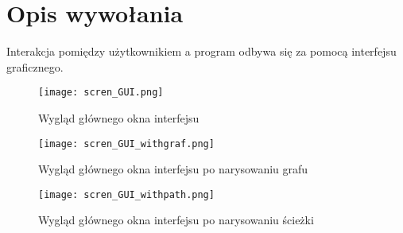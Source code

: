 \documentclass[]{article}
\begin{document}
\section{Opis wywołania}\label{header-n233}

Interakcja pomiędzy użytkownikiem a program odbywa się za pomocą interfejsu graficznego.

\begin{figure}[H]
\begin{center}
  \texttt{[image: scren\_GUI.png]}
  \end{center}
  \caption{Wygląd głównego okna interfejsu}
  \label{fig:graf}
\end{figure}

\begin{figure}[H]
\begin{center}
  \texttt{[image: scren\_GUI\_withgraf.png]}
  \end{center}
  \caption{Wygląd głównego okna interfejsu po narysowaniu grafu}
  \label{fig:graf}
\end{figure}

\begin{figure}[H]
\begin{center}
  \texttt{[image: scren\_GUI\_withpath.png]}
  \end{center}
  \caption{Wygląd głównego okna interfejsu po narysowaniu ścieżki}
  \label{fig:graf}
\end{figure}
\end{document}
